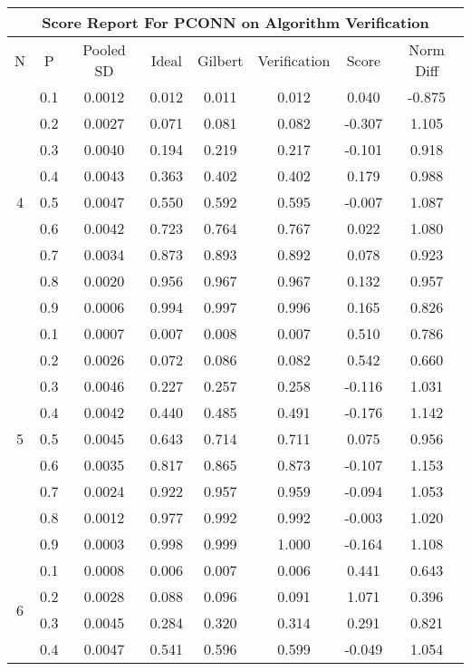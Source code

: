 \documentclass[11pt,a4paper]{report}
\begin{document}
\begin{longtable}{ | c | c || c | c | c | c | c | c | }
\hline
\multicolumn{8}{|c|}{ Score Report For PCONN on Algorithm Verification} \\
\hline
N & P & Pooled SD &  Ideal &  Gilbert & Verification  & Score & Norm Diff \\
 \hline
 \hline
 \endhead
\multirow{9}{*}{4} & 0.1 & 0.0012 & 0.012 & 0.011 & 0.012 & 0.040 & -0.875 \\
 & 0.2 & 0.0027 & 0.071 & 0.081 & 0.082 & -0.307 & 1.105 \\
 & 0.3 & 0.0040 & 0.194 & 0.219 & 0.217 & -0.101 & 0.918 \\
 & 0.4 & 0.0043 & 0.363 & 0.402 & 0.402 & 0.179 & 0.988 \\
 & 0.5 & 0.0047 & 0.550 & 0.592 & 0.595 & -0.007 & 1.087 \\
 & 0.6 & 0.0042 & 0.723 & 0.764 & 0.767 & 0.022 & 1.080 \\
 & 0.7 & 0.0034 & 0.873 & 0.893 & 0.892 & 0.078 & 0.923 \\
 & 0.8 & 0.0020 & 0.956 & 0.967 & 0.967 & 0.132 & 0.957 \\
 & 0.9 & 0.0006 & 0.994 & 0.997 & 0.996 & 0.165 & 0.826 \\
 \hline
\multirow{9}{*}{5} & 0.1 & 0.0007 & 0.007 & 0.008 & 0.007 & 0.510 & 0.786 \\
 & 0.2 & 0.0026 & 0.072 & 0.086 & 0.082 & 0.542 & 0.660 \\
 & 0.3 & 0.0046 & 0.227 & 0.257 & 0.258 & -0.116 & 1.031 \\
 & 0.4 & 0.0042 & 0.440 & 0.485 & 0.491 & -0.176 & 1.142 \\
 & 0.5 & 0.0045 & 0.643 & 0.714 & 0.711 & 0.075 & 0.956 \\
 & 0.6 & 0.0035 & 0.817 & 0.865 & 0.873 & -0.107 & 1.153 \\
 & 0.7 & 0.0024 & 0.922 & 0.957 & 0.959 & -0.094 & 1.053 \\
 & 0.8 & 0.0012 & 0.977 & 0.992 & 0.992 & -0.003 & 1.020 \\
 & 0.9 & 0.0003 & 0.998 & 0.999 & 1.000 & -0.164 & 1.108 \\
 \hline
\multirow{9}{*}{6} & 0.1 & 0.0008 & 0.006 & 0.007 & 0.006 & 0.441 & 0.643 \\
 & 0.2 & 0.0028 & 0.088 & 0.096 & 0.091 & 1.071 & 0.396 \\
 & 0.3 & 0.0045 & 0.284 & 0.320 & 0.314 & 0.291 & 0.821 \\
 & 0.4 & 0.0047 & 0.541 & 0.596 & 0.599 & -0.049 & 1.054 \\

\end{longtable}
\end{document}

